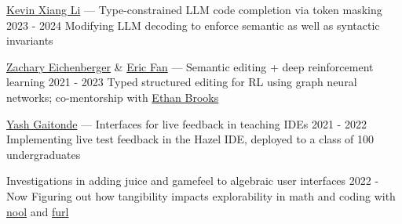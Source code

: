 \documentclass[10pt,a4paper]{article}
\begin{document}
\headedsubsection
{\href{https://kevinx.li/}{Kevin Xiang Li} --- Type-constrained LLM code completion via token masking}
{2023 - 2024}
{Modifying LLM decoding to enforce semantic as well as syntactic invariants}

\headedsubsection
{\href{https://openreview.net/profile?id=~Zachary_G_Eichenberger1}{Zachary Eichenberger} \& \href{https://github.com/yikai5518}{Eric Fan} --- Semantic editing + deep reinforcement learning}
{2021 - 2023}
{Typed structured editing for RL using graph neural networks; co-mentorship with \href{https://ethanabrooks.github.io/}{Ethan Brooks}}

\headedsubsection
{\href{https://yashgaitonde.com/}{Yash Gaitonde} --- Interfaces for live feedback in teaching IDEs}
{2021 - 2022}
{Implementing live test feedback in the Hazel IDE, deployed to a class of 100 undergraduates}


\headedsubsection
{Investigations in adding juice and gamefeel to algebraic user interfaces}
{2022 - Now}
{Figuring out how tangibility impacts explorability in math and coding with \href{https://nool.ing}{nool} and \href{https://furl.farm}{furl}}

\end{document}
